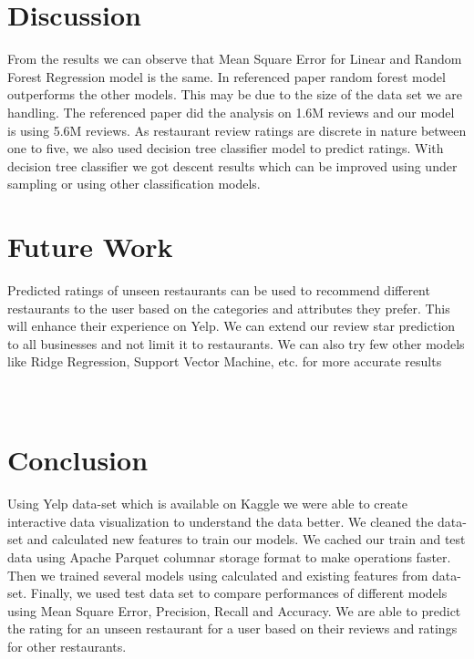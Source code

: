 \documentclass[12pt]{article}
\begin{document}
\section{Discussion}

From the results we can observe that Mean Square Error for Linear and Random Forest Regression model is the same. In referenced paper random forest model outperforms the other models. This may be due to the size of the data set we are handling. The referenced paper did the analysis on 1.6M reviews and our model is using 5.6M reviews. As restaurant review ratings are discrete in nature between one to five, we also used decision tree classifier model to predict ratings. With decision tree classifier we got descent results which can be improved using under sampling or using other classification models.

\section{Future Work}

Predicted ratings of unseen restaurants can be used to recommend different restaurants to the user based 
on the categories and attributes they prefer. This will enhance their experience on Yelp. 
We can extend our review star prediction to all businesses and not limit it to restaurants. 
We can also try few other models like Ridge Regression, Support Vector Machine, etc. for more accurate results \\ \\ \\

\section{Conclusion}

Using Yelp data-set which is available on Kaggle we were able to create interactive data visualization to understand the data better. We cleaned the data-set and calculated new features to train our models. We cached our train and test data using Apache Parquet columnar storage format to make operations faster. Then we trained several models using calculated and existing features from data-set. Finally, we used test data set to compare performances of different models using Mean Square Error, Precision, Recall and Accuracy. We are able to predict the rating for an unseen restaurant for a user based on their reviews and ratings for other restaurants.



 

\end{document}
